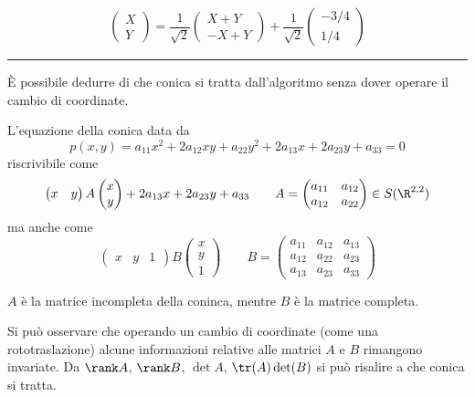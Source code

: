 \[
    \begin{pmatrix}
        X\\Y
    \end{pmatrix}=\frac{1}{\sqrt{2}}\begin{pmatrix}
        X+Y\\-X+Y
    \end{pmatrix}+\frac{1}{\sqrt{2}}\begin{pmatrix}
        -3/4\\ 1/4
    \end{pmatrix}
\]

\rule{7em}{.4pt}

È possibile dedurre di che conica si tratta dall'algoritmo senza dover operare il cambio di coordinate.

L'equazione della conica data da \[
    p(x,y)=a_{11} x^{2} + 2 a_{12} xy + a_{22}y^{2} + 2 a_{13}x + 2 a_{23} y + a_{33}=0
\] 
riscrivibile come 
\[
    \begin{pmatrix}
        x & y
    \end{pmatrix} A \begin{pmatrix}
        x\\ y
    \end{pmatrix} + 2a_{13} x + 2a_{23}y+a_{33}\qquad A=\begin{pmatrix}
        a_{11} & a_{12}\\
        a_{12} & a_{22}
    \end{pmatrix} \in S(\R^{2,2})
\] 
ma anche come
\[
    \begin{pmatrix}
        x & y & 1
    \end{pmatrix} B \begin{pmatrix}
        x\\ y\\ 1
    \end{pmatrix}\qquad B=\begin{pmatrix}
        a_{11} & a_{12} & a_{13}\\
        a_{12} & a_{22} & a_{23}\\
        a_{13} & a_{23} & a_{33}
    \end{pmatrix}
\]

$ A $ è la matrice incompleta della coninca, mentre $ B $ è la matrice completa.

Si può osservare che operando un cambio di coordinate (come una rototraslazione) alcune informazioni relative alle matrici $ A $ e $ B $ rimangono invariate. Da $ \rank A $, $ \rank B $, $ \det A $, $ \tr(A)\det(B) $ si può risalire a che conica si tratta.

